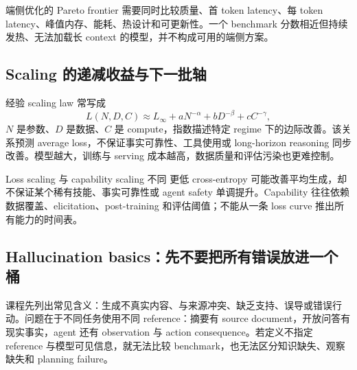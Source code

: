 
\begin{importantbox}{端侧优化的 Pareto frontier}
需要同时比较质量、首 token latency、每 token latency、峰值内存、能耗、热设计和可更新性。一个 benchmark 分数相近但持续发热、无法加载长 context 的模型，并不构成可用的端侧方案。
\end{importantbox}

\subsection{Scaling 的递减收益与下一批轴}

经验 scaling law 常写成
\[
L(N,D,C)\approx L_{\infty}+aN^{-\alpha}+bD^{-\beta}+cC^{-\gamma},
\]
$N$ 是参数、$D$ 是数据、$C$ 是 compute，指数描述特定 regime 下的边际改善。该关系预测 average loss，不保证事实可靠性、工具使用或 long-horizon reasoning 同步改善。模型越大，训练与 serving 成本越高，数据质量和评估污染也更难控制。




\begin{warningbox}{Loss scaling 与 capability scaling 不同}
更低 cross-entropy 可能改善平均生成，却不保证某个稀有技能、事实可靠性或 agent safety 单调提升。Capability 往往依赖数据覆盖、elicitation、post-training 和评估阈值；不能从一条 loss curve 推出所有能力的时间表。
\end{warningbox}

\subsection{Hallucination basics：先不要把所有错误放进一个桶}

课程先列出常见含义：生成不真实内容、与来源冲突、缺乏支持、误导或错误行动。问题在于不同任务使用不同 reference：摘要有 source document，开放问答有现实事实，agent 还有 observation 与 action consequence。若定义不指定 reference 与模型可见信息，就无法比较 benchmark，也无法区分知识缺失、观察缺失和 planning failure。

